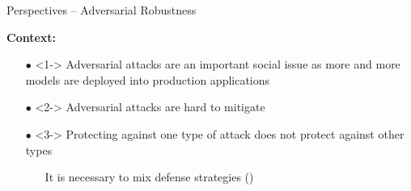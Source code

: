 \begin{frame}{Perspectives -- Adversarial Robustness}

  {\small
    \textbf{Context:}
    \vspace{-0.2cm}
    \begin{itemize}[leftmargin=0.2cm]
      \item[$\bullet$] <1-> Adversarial attacks are an important social issue as more and more models are deployed into production applications
      \item[$\bullet$] <2-> Adversarial attacks are hard to mitigate
      \item[$\bullet$] <3-> Protecting against one type of attack does not protect against other types
      \begin{itemize}
        \item[\orange{$\rightarrow$}] It is necessary to mix defense strategies ({})
      \end{itemize}
    \end{itemize}
  }
  
  \vspace{0.2cm}


\end{frame}







